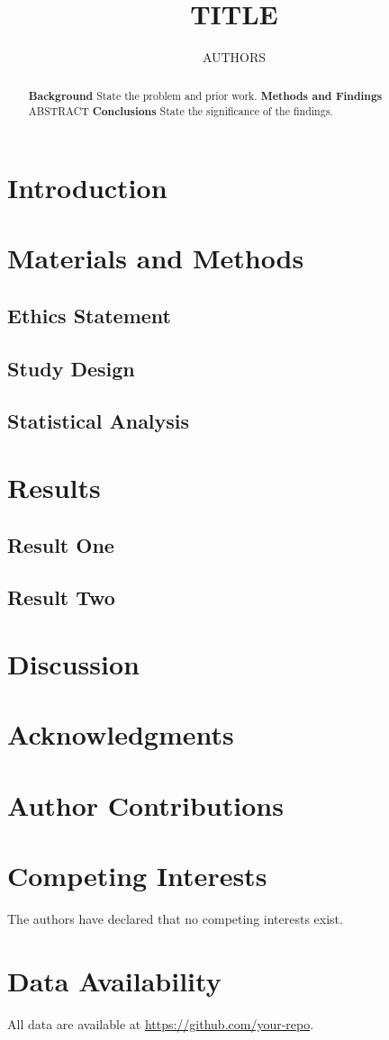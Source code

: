 \documentclass[10pt]{article}
\title{\textbf{{{TITLE}}}}
\author[1,\dag]{{{AUTHORS}}}
\affil[1]{{{AFFILIATIONS}}}
\affil[\dag]{Corresponding author: author@institution.edu}
\date{}
\begin{document}
\maketitle
\begin{abstract}
\textbf{Background} State the problem and prior work.
\textbf{Methods and Findings} {{ABSTRACT}}
\textbf{Conclusions} State the significance of the findings.
\end{abstract}
\linenumbers
\section{Introduction}
\section{Materials and Methods}
\subsection{Ethics Statement}
\subsection{Study Design}
\subsection{Statistical Analysis}
\section{Results}
\subsection{Result One}
\subsection{Result Two}
\section{Discussion}
\section*{Acknowledgments}
\section*{Author Contributions}
\section*{Competing Interests}
The authors have declared that no competing interests exist.
\section*{Data Availability}
All data are available at \url{https://github.com/your-repo}.


\end{document}
